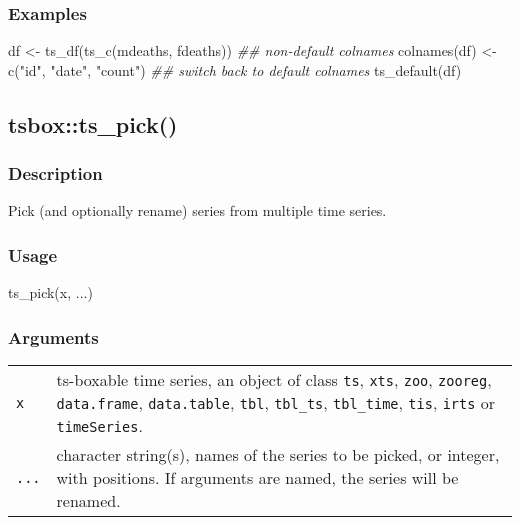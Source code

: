 \documentclass[
  letterpaper,
  DIV=11,
  numbers=noendperiod]{scrreport}
\newenvironment{Shaded}{\begin{snugshade}}{\end{snugshade}}
\newcommand{\DocumentationTok}[1]{\textcolor[rgb]{0.37,0.37,0.37}{\textit{#1}}}
\newcommand{\FunctionTok}[1]{\textcolor[rgb]{0.28,0.35,0.67}{#1}}
\newcommand{\NormalTok}[1]{\textcolor[rgb]{0.00,0.23,0.31}{#1}}
\newcommand{\OtherTok}[1]{\textcolor[rgb]{0.00,0.23,0.31}{#1}}
\newcommand{\StringTok}[1]{\textcolor[rgb]{0.13,0.47,0.30}{#1}}
\begin{document}
\subsubsection{Examples}\label{examples-56}

\begin{Shaded}
\begin{Highlighting}[]
\NormalTok{df }\OtherTok{\textless{}{-}} \FunctionTok{ts\_df}\NormalTok{(}\FunctionTok{ts\_c}\NormalTok{(mdeaths, fdeaths))}
\DocumentationTok{\#\# non{-}default colnames}
\FunctionTok{colnames}\NormalTok{(df) }\OtherTok{\textless{}{-}} \FunctionTok{c}\NormalTok{(}\StringTok{"id"}\NormalTok{, }\StringTok{"date"}\NormalTok{, }\StringTok{"count"}\NormalTok{)}
\DocumentationTok{\#\# switch back to default colnames}
\FunctionTok{ts\_default}\NormalTok{(df)}
\end{Highlighting}
\end{Shaded}

\subsection{tsbox::ts\_pick()}\label{tsboxts_pick}

\subsubsection{Description}\label{description-57}

Pick (and optionally rename) series from multiple time series.

\subsubsection{Usage}\label{usage-57}

\begin{Shaded}
\begin{Highlighting}[]
\FunctionTok{ts\_pick}\NormalTok{(x, ...)}
\end{Highlighting}
\end{Shaded}

\subsubsection{Arguments}\label{arguments-57}

\begin{longtable}[]{@{}ll@{}}
\toprule\noalign{}
\endhead
\bottomrule\noalign{}
\endlastfoot
\texttt{x} & ts-boxable time series, an object of class \texttt{ts},
\texttt{xts}, \texttt{zoo}, \texttt{zooreg}, \texttt{data.frame},
\texttt{data.table}, \texttt{tbl}, \texttt{tbl\_ts}, \texttt{tbl\_time},
\texttt{tis}, \texttt{irts} or \texttt{timeSeries}. \\
\texttt{...} & character string(s), names of the series to be picked, or
integer, with positions. If arguments are named, the series will be
renamed. \\
\end{longtable}
\end{document}

